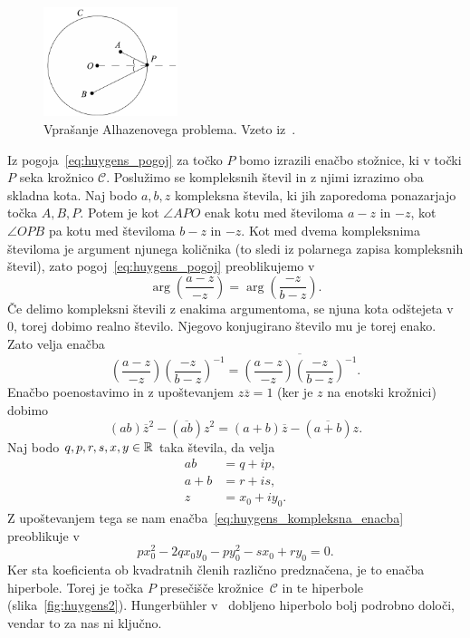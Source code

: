 \begin{figure}[h]
    \centering
    \includegraphics[width=0.35\textwidth]{images/alhazen/huygens1.png}
    \caption[Nastavek Huygensovega reševanja]{Vprašanje Alhazenovega problema. Vzeto iz~\cite[str.\ 37]{nishimura2018}.}
    \label{fig:huygens1}
\end{figure}

Iz pogoja~\eqref{eq:huygens_pogoj} za točko $P$ bomo izrazili enačbo stožnice, ki v točki $P$ seka krožnico $\mathcal{C}$. Poslužimo se kompleksnih števil in z njimi izrazimo oba skladna kota. Naj bodo $a, b, z$ kompleksna števila, ki jih zaporedoma ponazarjajo točka $A, B, P$. Potem je kot $\angle APO$ enak kotu med številoma $a-z$ in $-z$, kot $\angle OPB$ pa kotu med številoma $b-z$ in $-z$. Kot med dvema kompleksnima številoma je argument njunega količnika (to sledi iz polarnega zapisa kompleksnih števil), zato pogoj~\eqref{eq:huygens_pogoj} preoblikujemo v
$$ \arg \left(\frac{a-z}{-z}\right) = \arg \left(\frac{-z}{b-z}\right). $$
Če delimo kompleksni števili z enakima argumentoma, se njuna kota odštejeta v $0$, torej dobimo realno število. Njegovo konjugirano število mu je torej enako. Zato velja enačba
\begin{equation*}
    \left(\frac{a-z}{-z}\right) \left(\frac{-z}{b-z}\right)^{-1} = \overline{\left(\frac{a-z}{-z}\right) \left(\frac{-z}{b-z}\right)^{-1}}.
\end{equation*}
Enačbo poenostavimo in z upoštevanjem $z \overline{z} = 1$ (ker je $z$ na enotski krožnici) dobimo
\begin{equation}
    \label{eq:huygens_kompleksna_enacba}
    (ab) \overline{z}^2 - (\overline{ab}) z^2 = (a+b) \overline{z} - (\overline{a+b}) z.
\end{equation}
Naj bodo $q, p, r, s, x, y \in \mathbb R$ taka števila, da velja
\begin{align*}
    ab &= q + i p, \\
    a + b &= r + i s, \\
    z &= x_0 + i y_0.
\end{align*}
Z upoštevanjem tega se nam enačba~\eqref{eq:huygens_kompleksna_enacba} preoblikuje v
\begin{equation*}
    px_0^2 -2qx_0y_0 -py_0^2 - sx_0 + ry_0 = 0.
\end{equation*}
Ker sta koeficienta ob kvadratnih členih različno predznačena, je to enačba hiperbole. Torej je točka $P$ presečišče krožnice~$\mathcal{C}$ in te hiperbole (slika~\ref{fig:huygens2}). Hungerbühler v~\cite{hungerbuhler1992} dobljeno hiperbolo bolj podrobno določi, vendar to za nas ni ključno. 

